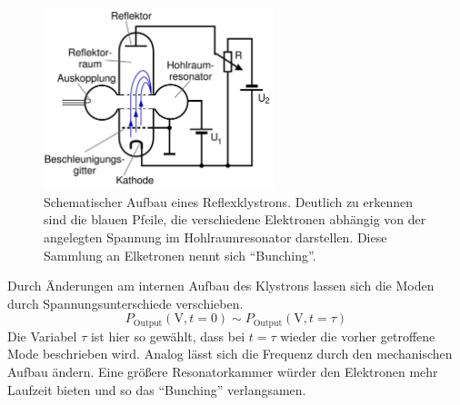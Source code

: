 \begin{figure}
    \centering
    \includegraphics[width=0.6\textwidth]{Bilder/theo.JPG}
    \caption{Schematischer Aufbau eines Reflexklystrons. Deutlich zu erkennen sind die blauen Pfeile, die verschiedene Elektronen abhängig von der angelegten Spannung im Hohlraumresonator darstellen. 
    Diese Sammlung an Elketronen nennt sich \enquote{Bunching}.} 
    \label{fig:ref}
\end{figure}
Durch Änderungen am internen Aufbau des Klystrons lassen sich die Moden durch Spannungsunterschiede verschieben. 
\begin{equation*}
    P_{\text{Output}} (\si{\volt}, t = 0) \sim P_{\text{Output}} (\si{\volt}, t = \tau)
\end{equation*}
Die Variabel $\tau$ ist hier so gewählt, dass bei $t = \tau$ wieder die vorher getroffene Mode beschrieben wird.
Analog lässt sich die Frequenz durch den mechanischen Aufbau ändern. Eine größere Resonatorkammer würder den Elektronen 
mehr Laufzeit bieten und so das \enquote{Bunching} verlangsamen.

\newpage 

